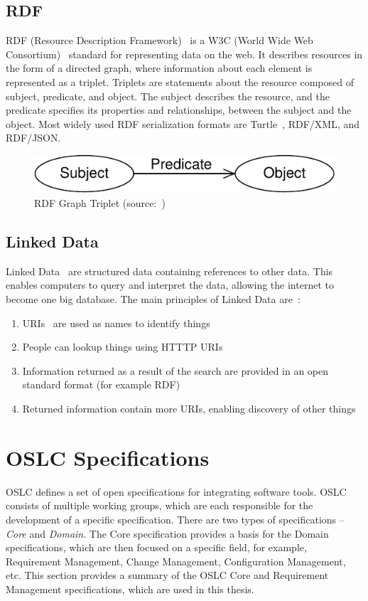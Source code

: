 \subsection*{RDF}
RDF (Resource Description Framework) \cite{rdf} is a W3C (World Wide Web Consortium) \cite{w3c} standard for representing data on the web. It describes resources in the form of a directed graph, where information about each element is represented as a triplet. Triplets are statements about the resource composed of subject, predicate, and object. The subject describes the resource, and the predicate specifies its properties and relationships, between the subject and the object. Most widely used RDF serialization formats are Turtle \cite{turtle}, RDF/XML, and RDF/JSON.

\begin{figure}[hbt]
  \centering
  \includegraphics[width=.6 \linewidth]{figures/rdf-graph.pdf}
  \caption{RDF Graph Triplet (source: \cite{rdf_primer})}
  \label{fig:rdf_graph_triplet}
\end{figure}

\subsection*{Linked Data}
Linked Data \cite{linked_data} are structured data containing references to other data. This enables computers to query and interpret the data, allowing the internet to become one big database. The main principles of Linked Data are \cite{linked_data_design_issues}:
\begin{enumerate}
  \item URIs \cite{uri_rfc} are used as names to identify things
  \item People can lookup things using HTTTP URIs
  \item Information returned as a result of the search are provided in an open standard format (for example RDF)
  \item Returned information contain more URIs, enabling discovery of other things
\end{enumerate}

\section{OSLC Specifications}
OSLC defines a set of open specifications for integrating software tools. OSLC consists of multiple working groups, which are each responsible for the development of a specific specification. There are two types of specifications -- \emph{Core} and \emph{Domain}. The Core specification provides a basis for the Domain specifications, which are then focused on a specific field, for example, Requirement Management, Change Management, Configuration Management, etc. This section provides a summary of the OSLC Core and Requirement Management specifications, which are used in this thesis.

